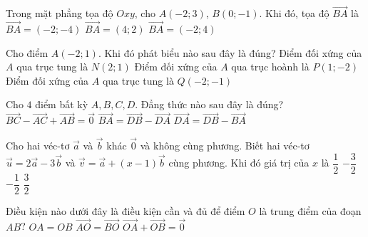 \begin{ex}%
	Trong mặt phẳng tọa độ $Oxy$, cho $A(-2; 3)$, $B(0; -1)$. Khi đó, tọa độ $\vec{BA}$ là
	{$\vec{BA} = (-2; -4)$}
	{$\vec{BA} = (4; 2)$}
	{\True $\vec{BA} = (-2; 4)$}
\end{ex}

\begin{ex}%
	Cho điểm $A(-2; 1)$. Khi đó phát biểu nào sau đây là đúng?
	{\True Điểm đối xứng của $A$ qua trục tung là $N(2; 1)$}
	{Điểm đối xứng của $A$ qua trục hoành là $P(1; -2)$}
	{Điểm đối xứng của $A$ qua trục tung là $Q(-2; -1)$}
\end{ex}

\begin{ex}%
	Cho $4$ điểm bất kỳ $A, B, C, D$. Đẳng thức nào sau đây là đúng?
	{\True $\vec{BC} - \vec{AC} + \vec{AB} = \vec{0}$}
	{$\vec{BA} = \vec{DB} - \vec{DA}$}
	{$\vec{DA} = \vec{DB} - \vec{BA}$}
\end{ex}

\begin{ex}%
	Cho hai véc-tơ $\vec{a}$ và $\vec{b}$ khác $\vec{0}$ và không cùng phương. Biết hai véc-tơ $\vec{u} = 2\vec{a} - 3\vec{b}$ và $\vec{v}= \vec{a} + (x - 1)\vec{b}$ cùng phương. Khi đó giá trị của $x$ là
	\choice
	{$\dfrac{1}{2}$}
	{$-\dfrac{3}{2}$}
	{\True $-\dfrac{1}{2}$}
	{$\dfrac{3}{2}$}
\end{ex}

\begin{ex}%
	Điều kiện nào dưới đây là điều kiện cần và đủ để điểm $O$ là trung điểm của đoạn $AB$?
	{$OA = OB$}
	{$\vec{AO} = \vec{BO}$}
	{\True $\vec{OA} + \vec{OB} = \vec{0}$}
\end{ex}

